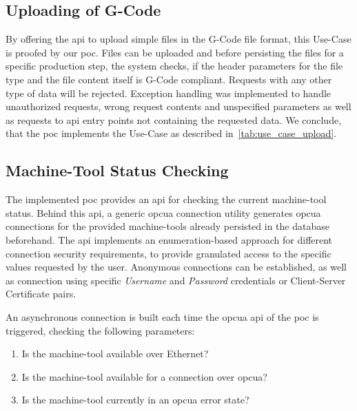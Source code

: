 \documentclass[
a4paper,
twoside,
headsepline,
cleardoublepage=empty,
parskip=half,
draft=false
]{scrbook}
\begin{document}
			\subsection{Uploading of G-Code}\label{subsec:uploading_g_code}

				By offering the \gls{api} to upload simple files in the G-Code file format, this Use-Case is proofed by our \gls{poc}. Files can be uploaded and before persisting the files for a specific production step, the system checks, if the header parameters for the file type and the file content itself is G-Code compliant. Requests with any other type of data will be rejected. Exception handling was implemented to handle unauthorized requests, wrong request contents and unspecified parameters as well as requests to \gls{api} entry points not containing the requested data.
				We conclude, that the \gls{poc} implements the Use-Case as described in~\cref{tab:use_case_upload}.

			\subsection{Machine-Tool Status Checking}\label{subsec:machine_tool_status_checking}

				The implemented \gls{poc} provides an \gls{api} for checking the current machine-tool status. Behind this \gls{api}, a generic \gls{opcua} connection utility generates \gls{opcua} connections for the provided machine-tools already persisted in the database beforehand. The \gls{api} implements an enumeration-based approach for different connection security requirements, to provide granulated access to the specific values requested by the user. Anonymous connections can be established, as well as connection using specific \textit{Username} and \textit{Password} credentials or Client-Server Certificate pairs.

				An asynchronous connection is built each time the \gls{opcua} \gls{api} of the \gls{poc} is triggered, checking the following parameters:

				\begin{enumerate}
					\item Is the machine-tool available over Ethernet?
					\item Is the machine-tool available for a connection over \gls{opcua}?
					\item Is the machine-tool currently in an \gls{opcua} error state?
				\end{enumerate}
\end{document}
